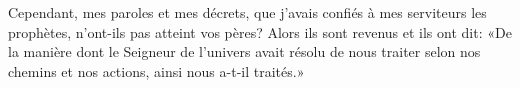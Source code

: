 Cependant, mes paroles et mes décrets, que j’avais confiés à mes serviteurs les prophètes,
	n’ont-ils pas atteint vos pères?
Alors ils sont revenus et ils ont dit:
	«De la manière dont le Seigneur de l’univers avait résolu de nous traiter
		selon nos chemins et nos actions, ainsi nous a-t-il traités.»
